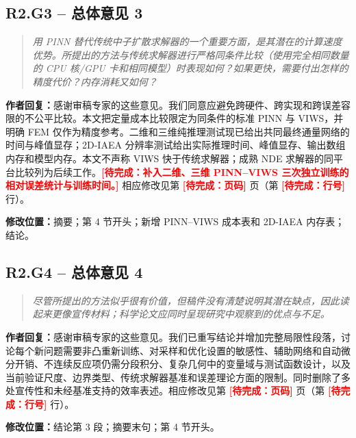 \documentclass[11pt,a4paper]{article}
\newenvironment{reviewercomment}{\begin{quote}\small\itshape\color{commentgray}}{\end{quote}}
\newcommand{\authorresponse}{\noindent\textbf{作者回复：}\quad}
\newcommand{\revisionlocation}[1]{\par\noindent\textcolor{locationblue}{\textbf{修改位置：}}#1}
\newcommand{\draftplaceholder}[1]{\textcolor{red}{\textbf{[待完成：#1]}}}
\begin{document}
\subsection*{R2.G3 -- 总体意见 3}
\begin{reviewercomment}
用 PINN 替代传统中子扩散求解器的一个重要方面，是其潜在的计算速度优势。所提出的方法与传统求解器进行严格同条件比较（使用完全相同数量的 CPU 核/GPU 卡和相同模型）时表现如何？如果更快，需要付出怎样的精度代价？内存消耗又如何？
\end{reviewercomment}
\authorresponse 感谢审稿专家的这些意见。我们同意应避免跨硬件、跨实现和跨误差容限的不公平比较。本文把定量成本比较限定为同条件的标准 PINN 与 VIWS，并明确 FEM 仅作为精度参考。二维和三维纯推理测试现已给出共同最终通量网络的时间与峰值显存；2D-IAEA 分辨率测试给出实际推理时间、峰值显存、输出数组内存和模型内存。本文不声称 VIWS 快于传统求解器；成熟 NDE 求解器的同平台比较列为后续工作。\draftplaceholder{补入二维、三维 PINN--VIWS 三次独立训练的相对误差统计与训练时间。}
相应修改见第 \draftplaceholder{页码} 页（第 \draftplaceholder{行号} 行）。
\revisionlocation{摘要；第 4 节开头；新增 PINN--VIWS 成本表和 2D-IAEA 内存表；结论。}

\subsection*{R2.G4 -- 总体意见 4}
\begin{reviewercomment}
尽管所提出的方法似乎很有价值，但稿件没有清楚说明其潜在缺点，因此读起来更像宣传材料；科学论文应同时呈现研究中观察到的优点与不足。
\end{reviewercomment}
\authorresponse 感谢审稿专家的这些意见。我们已重写结论并增加完整局限性段落，讨论每个新问题需要非凸重新训练、对采样和优化设置的敏感性、辅助网络和自动微分开销、不连续反应项仍需分段积分、复杂几何中的变量域与测试函数设计，以及当前验证尺度、边界类型、传统求解器基准和误差理论方面的限制。同时删除了多处宣传性和未经基准支持的效率表述。相应修改见第 \draftplaceholder{页码} 页（第 \draftplaceholder{行号} 行）。
\revisionlocation{结论第 3 段；摘要末句；第 4 节开头。}
\end{document}
